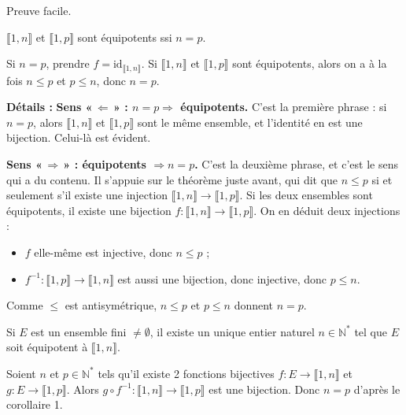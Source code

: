 \documentclass[a4paper,11pt]{article}
\newcommand{\N}{\mathbb{N}}
\begin{document}
\begin{demonstration}
Preuve facile.
\end{demonstration}

\begin{proposition}[Corollaire 1]
$\llbracket 1, n \rrbracket$ et $\llbracket 1, p \rrbracket$ sont équipotents ssi $n = p$.
\end{proposition}

\begin{demonstration}
Si $n = p$, prendre $f = \text{id}_{\llbracket 1, n \rrbracket}$.
Si $\llbracket 1, n \rrbracket$ et $\llbracket 1, p \rrbracket$ sont équipotents, alors on a à la fois $n \le p$ et $p \le n$, donc $n = p$.

\textbf{Détails :} 
\textbf{Sens «\,$\Leftarrow$\,» : $n=p \Rightarrow$ équipotents.}
C'est la première phrase : si $n=p$, alors $\llbracket 1,n\rrbracket$ et
$\llbracket 1,p\rrbracket$ sont le même ensemble, et l'identité en est une
bijection. Celui-là est évident.

\textbf{Sens «\,$\Rightarrow$\,» : équipotents $\Rightarrow n=p$.}
C'est la deuxième phrase, et c'est le sens qui a du contenu. Il s'appuie sur
le théorème juste avant, qui dit que $n \le p$ si et seulement s'il existe
une injection $\llbracket 1,n\rrbracket \to \llbracket 1,p\rrbracket$.
Si les deux ensembles sont équipotents, il existe une bijection
$f : \llbracket 1,n\rrbracket \to \llbracket 1,p\rrbracket$.
On en déduit deux injections :
\begin{itemize}
  \item $f$ elle-même est injective, donc $n \le p$ ;
  \item $f^{-1} : \llbracket 1,p\rrbracket \to \llbracket 1,n\rrbracket$ est
        aussi une bijection, donc injective, donc $p \le n$.
\end{itemize}
Comme $\le$ est antisymétrique, $n \le p$ et $p \le n$ donnent $n = p$.
\end{demonstration}

\begin{theoreme}[Corollaire 2]
Si $E$ est un ensemble fini $\neq \emptyset$, il existe un unique entier naturel $n \in \N^*$ tel que $E$ soit équipotent à $\llbracket 1, n \rrbracket$.
\end{theoreme}

\begin{demonstration}
Soient $n$ et $p \in \N^*$ tels qu'il existe 2 fonctions bijectives $f : E \to \llbracket 1, n \rrbracket$ et $g : E \to \llbracket 1, p \rrbracket$.
Alors $g \circ f^{-1} : \llbracket 1, n \rrbracket \to \llbracket 1, p \rrbracket$ est une bijection. Donc $n = p$ d'après le corollaire 1.
\end{demonstration}
\end{document}
